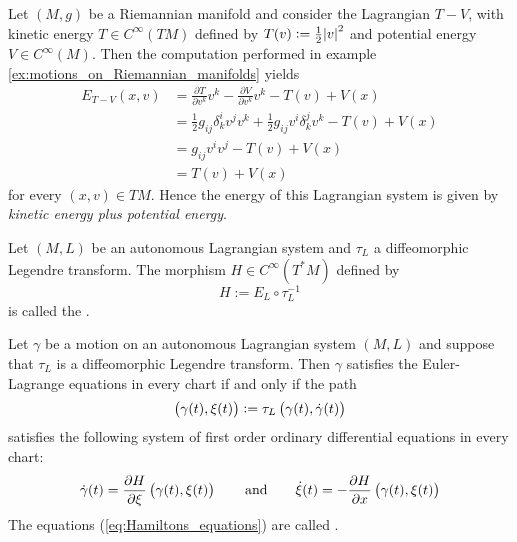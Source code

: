 \begin{example}
	Let $(M,g)$ be a Riemannian manifold and consider the Lagrangian $T - V$, with kinetic energy $T \in C^\infty(TM)$ defined by $T(v) := \frac{1}{2}\abs{v}^2$ and potential energy $V \in C^\infty(M)$. Then the computation performed in example \ref{ex:motions_on_Riemannian_manifolds} yields
	\begin{align*}
		E_{T - V}(x,v) &= \frac{\partial T}{\partial v^k}v^k - \frac{\partial V}{\partial v^k}v^k - T(v) + V(x)\\
		&= \frac{1}{2}g_{ij}\delta^i_k v^jv^k + \frac{1}{2}g_{ij}v^i \delta^j_k v^k - T(v) + V(x)\\
		&= g_{ij}v^i v^j - T(v) + V(x)\\
		&= T(v) + V(x)
	\end{align*}
	\noindent for every $(x,v) \in TM$. Hence the energy of this Lagrangian system is given by \emph{kinetic energy plus potential energy}.
\end{example}

\begin{definition}
	Let $(M,L)$ be an autonomous Lagrangian system and $\tau_L$ a diffeomorphic Legendre transform. The morphism $H \in C^\infty(T^*M)$ defined by
	\begin{equation*}
		H := E_L \circ \tau_L^{-1}
	\end{equation*}
	\noindent is called the .
\end{definition}

\begin{theorem}
	\label{thm:Hamiltons_equations}
	Let $\gamma$ be a motion on an autonomous Lagrangian system $(M,L)$ and suppose that $\tau_L$ is a diffeomorphic Legendre transform. Then $\gamma$ satisfies the Euler-Lagrange equations in every chart if and only if the path 
	\begin{equation*}
			\del[1]{\gamma(t),\xi(t)} := \tau_L\del[1]{\gamma(t),\dot{\gamma}(t)}
	\end{equation*}
	\noindent satisfies the following system of first order ordinary differential equations in every chart:
	\begin{equation}
		\label{eq:Hamiltons_equations}
		\dot{\gamma}(t) = \frac{\partial H}{\partial \xi}\del[1]{\gamma(t),\xi(t)} \qquad \text{and} \qquad \dot{\xi}(t) = -\frac{\partial H}{\partial x}\del[1]{\gamma(t),\xi(t)}
	\end{equation}
	The equations \textup{(}\ref{eq:Hamiltons_equations}\textup{)} are called .
\end{theorem}

